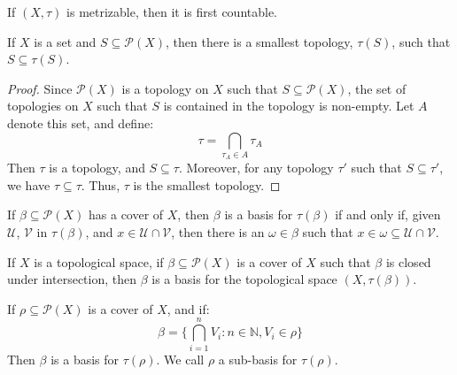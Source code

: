 \documentclass[crop=false,class=book,oneside]{standalone}                      %
\begin{document}
            \begin{theorem}
                If $(X,\tau)$ is metrizable, then it is first
                countable.
            \end{theorem}
            \begin{theorem}
                If $X$ is a set and $S\subseteq\mathcal{P}(X)$,
                then there is a smallest topology, $\tau(S)$, such
                that $S\subseteq\tau(S)$.
            \end{theorem}
            \begin{proof}
                Since $\mathcal{P}(X)$ is a topology on $X$ such
                that $S\subseteq\mathcal{P}(X)$, the set of
                topologies on $X$ such that $S$ is contained in
                the topology is non-empty. Let $A$ denote this set,
                and define:
                \begin{equation}
                    \tau=\bigcap_{\tau_{A}\in{A}}\tau_{A}
                \end{equation}
                Then $\tau$ is a topology, and $S\subseteq\tau$.
                Moreover, for any topology $\tau'$ such
                that $S\subseteq\tau'$, we have $\tau\subseteq\tau$.
                Thus, $\tau$ is the smallest topology.
            \end{proof}
            \begin{theorem}
                If $\beta\subseteq\mathcal{P}(X)$ has a cover of
                $X$, then $\beta$ is a basis for
                $\tau(\beta)$ if and only if, given $\mathcal{U}$,
                $\mathcal{V}$ in $\tau(\beta)$, and
                $x\in\mathcal{U}\cap\mathcal{V}$, then there is an
                $\omega\in\beta$ such that
                $x\in\omega\subseteq\mathcal{U}\cap\mathcal{V}$.
            \end{theorem}
            \begin{theorem}
                If $X$ is a topological space, if
                $\beta\subseteq\mathcal{P}(X)$ is a cover of $X$
                such that $\beta$ is closed under intersection,
                then $\beta$ is a basis for the topological space
                $(X,\tau(\beta))$.
            \end{theorem}
            \begin{theorem}
                If $\rho\subseteq\mathcal{P}(X)$ is a cover of
                $X$, and if:
                \begin{equation}
                    \beta=\Big\{\bigcap_{i=1}^{n}V_{i}:
                        n\in\mathbb{N},V_{i}\in\rho\Big\}
                \end{equation}
                Then $\beta$ is a basis for $\tau(\rho)$. We call
                $\rho$ a sub-basis for $\tau(\rho)$.
            \end{theorem}
\end{document}
